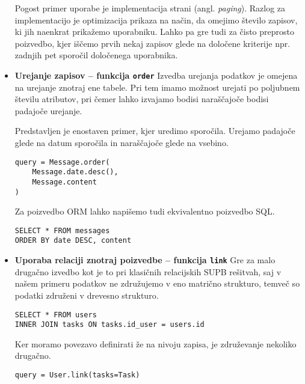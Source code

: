 \documentclass[a4paper,12pt,openright]{book}
\begin{document}
\begin{itemize}
        Pogost primer uporabe je implementacija strani (angl. \textit{paging}). Razlog za implementacijo je optimizacija prikaza na način, da omejimo število zapisov, ki jih naenkrat prikažemo uporabniku. Lahko pa gre tudi za čisto preprosto poizvedbo, kjer iščemo prvih nekaj zapisov glede na določene kriterije npr. zadnjih pet sporočil določenega uporabnika.
        
        \item \textbf{Urejanje zapisov – funkcija {\tt order}} 
        \newline
        \noindent
        Izvedba urejanja podatkov je omejena na urejanje znotraj ene tabele. Pri tem imamo možnost urejati po poljubnem številu atributov, pri čemer lahko izvajamo bodisi naraščajoče bodisi padajoče urejanje.

        Predstavljen je enostaven primer, kjer uredimo sporočila. Urejamo padajoče glede na datum sporočila in naraščajoče glede na vsebino.

\begin{verbatim}
query = Message.order(
    Message.date.desc(),
    Message.content
)
\end{verbatim}    

        \noindent
        Za poizvedbo ORM lahko napišemo tudi ekvivalentno poizvedbo SQL.

\begin{verbatim}
SELECT * FROM messages
ORDER BY date DESC, content
\end{verbatim}          

        \item \textbf{Uporaba relaciji znotraj poizvedbe – funkcija {\tt link}}
        \newline
        \noindent
        Gre za malo drugačno izvedbo kot je to pri klasičnih relacijskih SUPB rešitvah, saj v našem primeru podatkov ne združujemo v eno matrično strukturo, temveč so podatki združeni v drevesno strukturo.

\begin{verbatim}
SELECT * FROM users
INNER JOIN tasks ON tasks.id_user = users.id
\end{verbatim}

        \noindent
        Ker moramo povezavo definirati že na nivoju zapisa, je združevanje nekoliko drugačno.

\begin{verbatim}
query = User.link(tasks=Task)
\end{verbatim}


\end{itemize}
\end{document}
